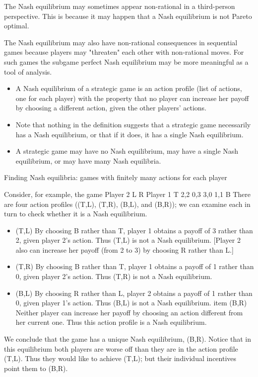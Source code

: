 \documentclass[a4paper,12pt]{article}
\begin{document}
The Nash equilibrium may sometimes appear non-rational in a third-person perspective. This is because it may happen that a Nash equilibrium is not Pareto optimal.

The Nash equilibrium may also have non-rational consequences in sequential games because players may "threaten" each other with non-rational moves. For such games the subgame perfect Nash equilibrium may be more meaningful as a tool of analysis.

\newpage
\begin{itemize}
\item A Nash equilibrium of a strategic game is an action profile (list of actions, one for each player) with the property that no player can increase her payoff by choosing a different action, given the other players' actions.
\item Note that nothing in the definition suggests that a strategic game necessarily has a Nash equilibrium, or that if it does, it has a single Nash equilibrium. 
\item A strategic game may have no Nash equilibrium, may have a single Nash equilibrium, or may have many Nash equilibria.
\end{itemize}
Finding Nash equilibria: games with finitely many actions for each player

Consider, for example, the game
Player 2
L	R
Player 1	T	
2,2	0,3
3,0	1,1
B
There are four action profiles ((T,L), (T,R), (B,L), and (B,R)); we can examine each in turn to check whether it is a Nash equilibrium.
\begin{itemize}
\item (T,L)
By choosing B rather than T, player 1 obtains a payoff of 3 rather than 2, given player 2's action. Thus (T,L) is not a Nash equilibrium. [Player 2 also can increase her payoff (from 2 to 3) by choosing R rather than L.]
\item (T,R)
By choosing B rather than T, player 1 obtains a payoff of 1 rather than 0, given player 2's action. Thus (T,R) is not a Nash equilibrium.
\item (B,L)
By choosing R rather than L, player 2 obtains a payoff of 1 rather than 0, given player 1's action. Thus (B,L) is not a Nash equilibrium.
item (B,R)
Neither player can increase her payoff by choosing an action different from her current one. Thus this action profile is a Nash equilibrium.
\end{itemize}
We conclude that the game has a unique Nash equilibrium, (B,R).
Notice that in this equilibrium both players are worse off than they are in the action profile (T,L). Thus they would like to achieve (T,L); but their individual incentives point them to (B,R).
\newpage
\end{document}
